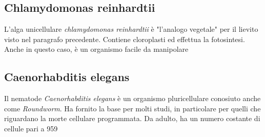 \subsection{Chlamydomonas reinhardtii}
L'alga unicellulare \textit{chlamydomonas reinhardtii} è "l'analogo vegetale" per il lievito visto nel paragrafo precedente. Contiene cloroplasti ed effettua la fotosintesi. Anche in questo caso, è un organismo facile da manipolare

\subsection{Caenorhabditis elegans}
Il nematode \textit{Caenorhabditis elegans} è un organismo pluricellulare conosiuto anche come \textit{Roundworm}. Ha fornito la base per molti studi, in particolare per quelli che riguardano la morte cellulare programmata. Da adulto, ha un numero costante di cellule pari a 959

\pagebreak